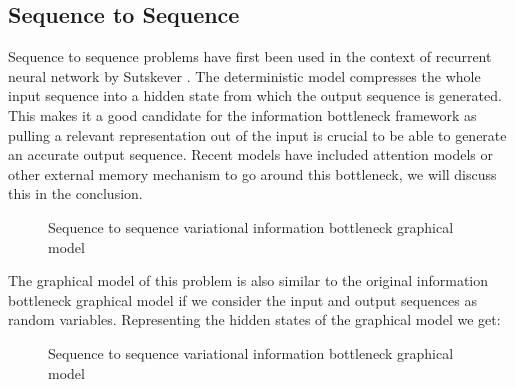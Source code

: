 \documentclass[11pt,oneside,openright]{report}
\begin{document}
\subsection{Sequence to Sequence}
Sequence to sequence problems have first been used in the context of recurrent neural network by Sutskever \cite{s2s}. The deterministic model compresses the whole input sequence into a hidden state from which the output sequence is generated. This makes it a good candidate for the information bottleneck framework as pulling a relevant representation out of the input is crucial to be able to generate an accurate output sequence. Recent models have included attention \cite{attention} models or other external memory mechanism to go around this bottleneck, we will discuss this in the conclusion.

\begin{figure}[H]
\centering
{}
\caption{Sequence to sequence variational information bottleneck graphical model}
\end{figure}

The graphical model of this problem is also similar to the original information bottleneck graphical model if we consider the input and output sequences as random variables. Representing the hidden states of the graphical model we get: 


\begin{figure}[H]
\centering
{}
\caption{Sequence to sequence variational information bottleneck graphical model}
\end{figure}
\end{document}
